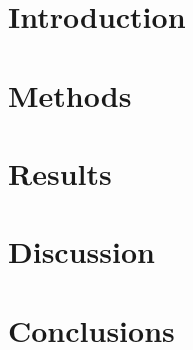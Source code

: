 \documentclass[12pt]{article}
\begin{document}
\maketitle

\begin{abstract}

\end{abstract}


\section{Introduction}

\section{Methods}

\section{Results}

\section{Discussion}

\section{Conclusions}



\end{document}
